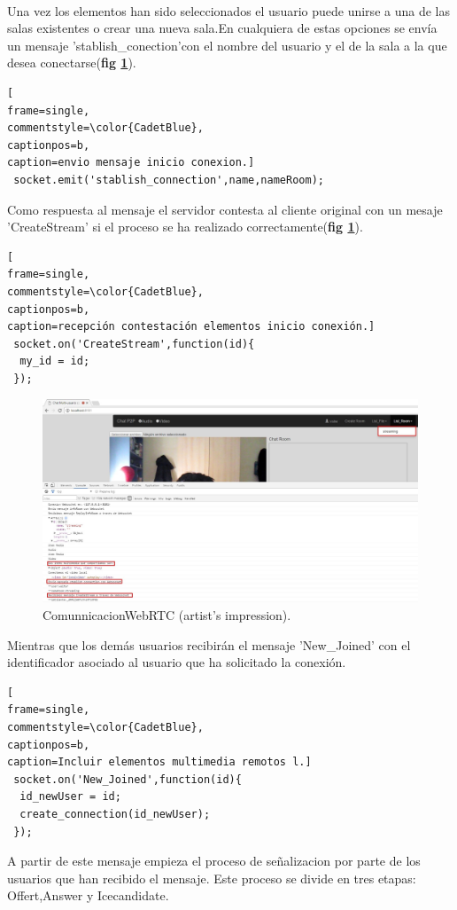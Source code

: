 \\Una vez los elementos han sido seleccionados el usuario puede unirse a una de las salas existentes o crear una nueva sala.En cualquiera de estas opciones se envía un mensaje 'stablish\_conection'con el nombre del usuario y el de la sala a la que desea conectarse(\textbf{fig \ref{fig:StablishConnectionClient}}).
\begin{lstlisting}[
frame=single,
commentstyle=\color{CadetBlue},
captionpos=b,
caption=envio mensaje inicio conexion.]
 socket.emit('stablish_connection',name,nameRoom);
\end{lstlisting}
Como respuesta al mensaje el servidor contesta al cliente original con un mesaje 'CreateStream' si el proceso se ha realizado correctamente(\textbf{fig \ref{fig:StablishConnectionClient}}).
\begin{lstlisting}[
frame=single,
commentstyle=\color{CadetBlue},
captionpos=b,
caption=recepción contestación elementos inicio conexión.]
 socket.on('CreateStream',function(id){
  my_id = id;
 });
\end{lstlisting}
\begin{figure}[!h]
\centering
\includegraphics[width=0.7\linewidth]{Figures/StablishConnectionClient}
\decoRule
\caption[An Electron]{ComunnicacionWebRTC (artist's impression).}
\label{fig:StablishConnectionClient}
\end{figure}
Mientras que los demás usuarios recibirán el mensaje 'New\_Joined' con el identificador asociado al usuario que ha solicitado la conexión.
\begin{lstlisting}[
frame=single,
commentstyle=\color{CadetBlue},
captionpos=b,
caption=Incluir elementos multimedia remotos l.]
 socket.on('New_Joined',function(id){
  id_newUser = id;
  create_connection(id_newUser);
 });
\end{lstlisting}
A partir de este mensaje empieza el proceso de señalizacion por parte de los usuarios que han recibido el mensaje. Este proceso se divide en tres etapas:
Offert,Answer y Icecandidate.

